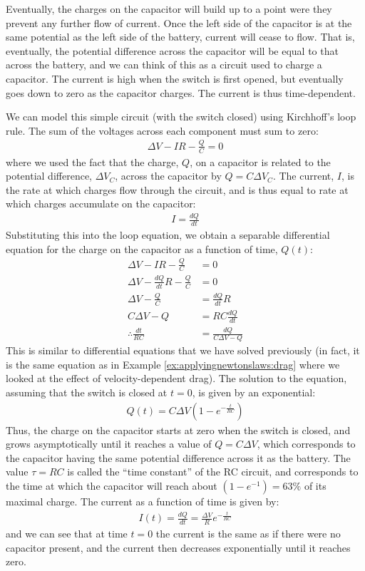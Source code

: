 Eventually, the charges on the capacitor will build up to a point were they prevent any further flow of current. Once the left side of the capacitor is at the same potential as the left side of the battery, current will cease to flow. That is, eventually, the potential difference across the capacitor will be equal to that across the battery, and we can think of this as a circuit used to charge a capacitor. The current is high when the switch is first opened, but eventually goes down to zero as the capacitor charges. The current is thus time-dependent. 

We can model this simple circuit (with the switch closed) using Kirchhoff's loop rule. The sum of the voltages across each component must sum to zero:
\begin{align*}
\Delta V - IR - \frac{Q}{C} = 0
\end{align*}
where we used the fact that the charge, $Q$, on a capacitor is related to the potential difference, $\Delta V_C$, across the capacitor by $Q=C\Delta V_C$. The current, $I$, is the rate at which charges flow through the circuit, and is thus equal to rate at which charges accumulate on the capacitor:
\begin{align*}
I=\frac{dQ}{dt}
\end{align*}
Substituting this into the loop equation, we obtain a separable differential equation for the charge on the capacitor as a function of time, $Q(t)$:
\begin{align*}
\Delta V - IR - \frac{Q}{C} &= 0\\
\Delta V - \frac{dQ}{dt}R - \frac{Q}{C} &= 0\\
\Delta V - \frac{Q}{C} &= \frac{dQ}{dt}R\\
C\Delta V - Q &= RC\frac{dQ}{dt}\\
\therefore \frac{dt}{RC}&=\frac{dQ}{C\Delta V - Q }
\end{align*}
This is similar to differential equations that we have solved previously (in fact, it is the same equation as in Example \ref{ex:applyingnewtonslaws:drag} where we looked at the effect of velocity-dependent drag). The solution to the equation, assuming that the switch is closed at $t=0$, is given by an exponential:
\begin{align*}
Q(t) = C\Delta V\left( 1 - e^{-\frac{t}{RC}} \right)
\end{align*}
Thus, the charge on the capacitor starts at zero when the switch is closed, and grows asymptotically until it reaches a value of $Q=C\Delta V$, which corresponds to the capacitor having the same potential difference across it as the battery. The value $\tau=RC$ is called the ``time constant'' of the RC circuit, and corresponds to the time at which the capacitor will reach about $(1-e^{-1})=63\%$ of its maximal charge. The current as a function of time is given by:
\begin{align*}
I(t)=\frac{dQ}{dt}=\frac{\Delta V}{R}e^{-\frac{t}{RC}}
\end{align*}
and we can see that at time $t=0$ the current is the same as if there were no capacitor present, and the current then decreases exponentially until it reaches zero.
\newpage
